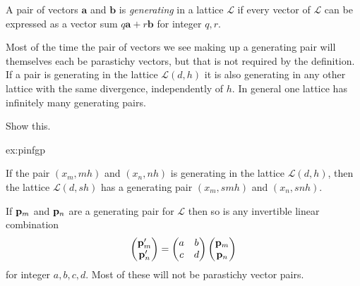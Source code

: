 \begin{definition} A pair of vectors $\mathbf{a}$ and $\mathbf{b}$
		   is \emph{generating} in a lattice $\mathcal{L}$ if every vector of $\mathcal{L}$ can be expressed as a vector sum $q\mathbf{a}+r\mathbf{b}$
		   for integer $q,r$.
\label{def:g}
\end{definition}
 Most of the time the pair of vectors we see making up a generating pair will themselves each be parastichy vectors, but that is not required by the definition. If a pair is generating in the lattice $\mathcal{L}(d,h)$ it is also generating in any other lattice with the same divergence, independently of $h$. In general one lattice has infinitely many generating pairs. 
\begin{jExercise}\label{ex:pinfgp}
	Show this.
\end{jExercise}
\begin{jAnswer}{ex:pinfgp}{
	If the pair $(x_m, m h)$ and $(x_n,n h)$ is generating in the lattice $\mathcal{L}(d,h)$, then the lattice  $\mathcal{L}(d, s h )$ has a generating pair $(x_m, s m h)$ and $(x_n,s n h)$.
	
	If ${\mathbf p}_{m}$ and ${\mathbf p}_{n}$ are a generating pair for $\mathcal{L}$ then so is any invertible linear combination
	\begin{equation}
		\begin{pmatrix}
		{\mathbf p}_{m}' \\ {\mathbf p}_{n}' 
		\end{pmatrix}= 
	\begin{pmatrix}
		a & b  \\ c & d  
	\end{pmatrix}	\begin{pmatrix}
	{\mathbf p}_{m} \\ {\mathbf p}_{n} 
\end{pmatrix}
	\end{equation}
	for integer $a,b,c,d$. Most of these will not be parastichy vector pairs.
}\end{jAnswer}

